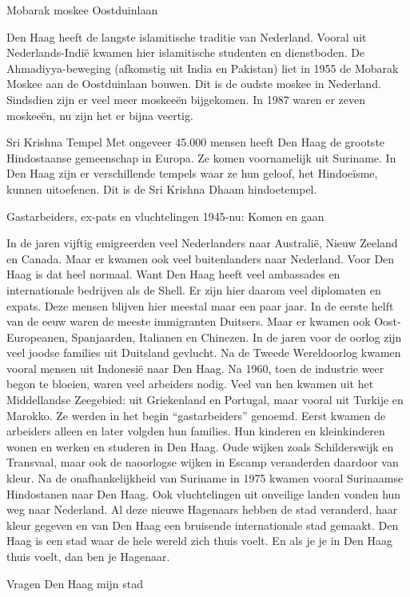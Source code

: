 \documentclass[
  a4paper,
]{book}
\begin{document}
Mobarak moskee Oostduinlaan

Den Haag heeft de langste islamitische traditie van Nederland. Vooral uit Nederlands-Indië kwamen hier islamitische studenten en dienstboden. De Ahmadiyya-beweging (afkomstig uit India en Pakistan) liet in 1955 de Mobarak Moskee aan de Oostduinlaan bouwen. Dit is de oudste moskee in Nederland. Sindsdien zijn er veel meer moskeeën bijgekomen. In 1987 waren er zeven moskeeën, nu zijn het er bijna veertig.

Sri Krishna Tempel
Met ongeveer 45.000 mensen heeft Den Haag de grootste Hindostaanse gemeenschap in Europa. Ze komen voornamelijk uit Suriname. In Den Haag zijn er verschillende tempels waar ze hun geloof, het Hindoeïsme, kunnen uitoefenen. Dit is de Sri Krishna Dhaam hindoetempel.

Gastarbeiders, ex-pats en vluchtelingen
1945-nu: Komen en gaan

In de jaren vijftig emigreerden veel Nederlanders naar Australië, Nieuw Zeeland en Canada.
Maar er kwamen ook veel buitenlanders naar Nederland.
Voor Den Haag is dat heel normaal.
Want Den Haag heeft veel ambassades en internationale bedrijven als de Shell.
Er zijn hier daarom veel diplomaten en expats.
Deze mensen blijven hier meestal maar een paar jaar.
In de eerste helft van de eeuw waren de meeste immigranten Duitsers.
Maar er kwamen ook Oost-Europeanen, Spanjaarden, Italianen en Chinezen.
In de jaren voor de oorlog zijn veel joodse families uit Duitsland gevlucht.
Na de Tweede Wereldoorlog kwamen vooral mensen uit Indonesië naar Den Haag.
Na 1960, toen de industrie weer begon te bloeien, waren veel arbeiders nodig.
Veel van hen kwamen uit het Middellandse Zeegebied: uit Griekenland en Portugal, maar vooral uit Turkije en Marokko.
Ze werden in het begin ``gastarbeiders'' genoemd.
Eerst kwamen de arbeiders alleen en later volgden hun families.
Hun kinderen en kleinkinderen wonen en werken en studeren in Den Haag.
Oude wijken zoals Schilderswijk en Transvaal, maar ook de naoorlogse wijken in Escamp veranderden daardoor van kleur.
Na de onafhankelijkheid van Suriname in 1975 kwamen vooral Surinaamse Hindostanen naar Den Haag.
Ook vluchtelingen uit onveilige landen vonden hun weg naar Nederland.
Al deze nieuwe Hagenaars hebben de stad veranderd, haar kleur gegeven en van Den Haag een bruisende internationale stad gemaakt.
Den Haag is een stad waar de hele wereld zich thuis voelt.
En als je je in Den Haag thuis voelt, dan ben je Hagenaar.

Vragen Den Haag mijn stad
\end{document}
